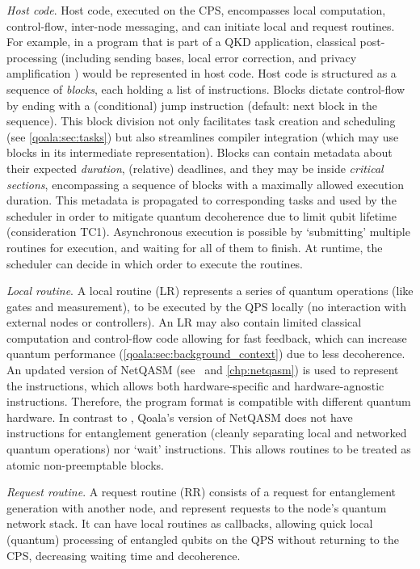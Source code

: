 \textit{Host code}.
Host code, executed on the CPS, encompasses local computation, control-flow, inter-node messaging, and can initiate local and request routines.
For example, in a program that is part of a QKD application, classical post-processing (including sending bases, local error correction, and privacy amplification \cite{vidick2023introduction}) would be represented in host code.
Host code is structured as a sequence of \textit{blocks}, each holding a list of instructions.
Blocks dictate control-flow by ending with a (conditional) jump instruction (default: next block in the sequence).
This block division not only facilitates task creation and scheduling (see \cref{qoala:sec:tasks}) but also streamlines compiler integration (which may use blocks in its intermediate representation).
Blocks can contain metadata about their expected \textit{duration}, (relative) deadlines, and they may be inside \textit{critical sections}, encompassing a sequence of blocks with a maximally allowed execution duration. This metadata is propagated to corresponding tasks and used by the scheduler in order to mitigate quantum decoherence due to limit qubit lifetime (consideration TC1).
Asynchronous execution is possible by `submitting' multiple routines for execution, and waiting for all of them to finish. At runtime, the scheduler can decide in which order to execute the routines.


\textit{Local routine}.
A local routine (LR) represents a series of quantum operations (like gates and measurement), to be executed by the QPS locally (no interaction with external nodes or controllers).
An LR may also contain limited classical computation and control-flow code allowing for fast feedback, which can increase quantum performance (\cref{qoala:sec:background_context}) due to less decoherence.
An updated version of NetQASM (see~\cite{dahlberg2022netqasm} and \cref{chp:netqasm}) is used to represent the instructions, which allows both hardware-specific and hardware-agnostic instructions.
Therefore, the program format is compatible with different quantum hardware.
In contrast to \cite{dahlberg2022netqasm}, Qoala's version of NetQASM does not have instructions for entanglement generation (cleanly separating local and networked quantum operations)
nor `wait' instructions. This allows routines to be treated as atomic non-preemptable blocks.

\textit{Request routine}. A request routine (RR) consists of a request for entanglement generation with another node, and represent requests to the node's quantum network stack.
It can have local routines as callbacks, allowing quick local (quantum) processing of entangled qubits on the QPS without returning to the CPS, decreasing waiting time and decoherence.



